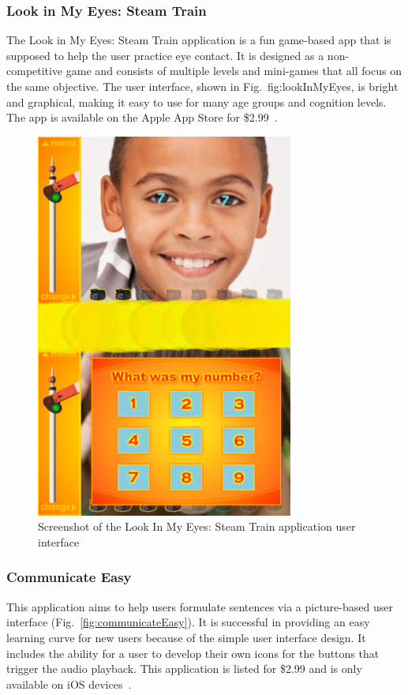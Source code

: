 \subsubsection{Look in My Eyes: Steam Train}
The Look in My Eyes: Steam Train application is a fun game-based app that is supposed to help the user practice eye contact. It is designed as a non-competitive game and consists of multiple levels and mini-games that all focus on the same objective. The user interface, shown in Fig.~{fig:lookInMyEyes}, is bright and graphical, making it easy to use for many age groups and cognition levels. The app is available on the Apple App Store for \$2.99~\cite{lookInMyEyes}.

\begin{figure}[!htb]
\centering
\includegraphics[width=.6\textwidth]{lookInMyEyes.png}
\caption{\label{fig:lookInMyEyes}Screenshot of the Look In My Eyes: Steam Train application user interface}
\end{figure}

\subsubsection{Communicate Easy}
This application aims to help users formulate sentences via a picture-based user interface (Fig.~\ref{fig:communicateEasy}). It is successful in providing an easy learning curve for new users because of the simple user interface design. It includes the ability for a user to develop their own icons for the buttons that trigger the audio playback. This application is listed for \$2.99 and is only available on iOS devices~\cite{communicateEasy}.


